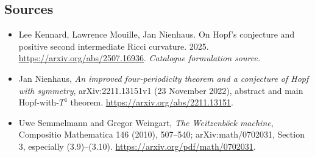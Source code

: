 \documentclass[11pt,a4paper]{article}
\begin{document}
\subsection{Sources}
\begin{itemize}\raggedright
\item[\textnormal{[S1]}]\hypertarget{source:211:1}{} Lee Kennard, Lawrence Mouille, Jan Nienhaus. On Hopf's conjecture and positive second intermediate Ricci curvature. 2025.
\url{https://arxiv.org/abs/2507.16936}.
{\small\textit{Catalogue formulation source.}}
\item[\textnormal{[E1]}]\hypertarget{extra:211:1}{} Jan Nienhaus,
\emph{An improved four-periodicity theorem and a conjecture of Hopf with symmetry},
arXiv:2211.13151v1 (23 November 2022), abstract and main Hopf-with-$T^4$ theorem.
\url{https://arxiv.org/abs/2211.13151}.
\item[\textnormal{[E2]}]\hypertarget{extra:211:2}{} Uwe Semmelmann and Gregor Weingart,
\emph{The Weitzenb\"ock machine}, Compositio Mathematica 146 (2010), 507--540;
arXiv:math/0702031, Section 3, especially (3.9)--(3.10).
\url{https://arxiv.org/pdf/math/0702031}.
\end{itemize}
\end{document}
